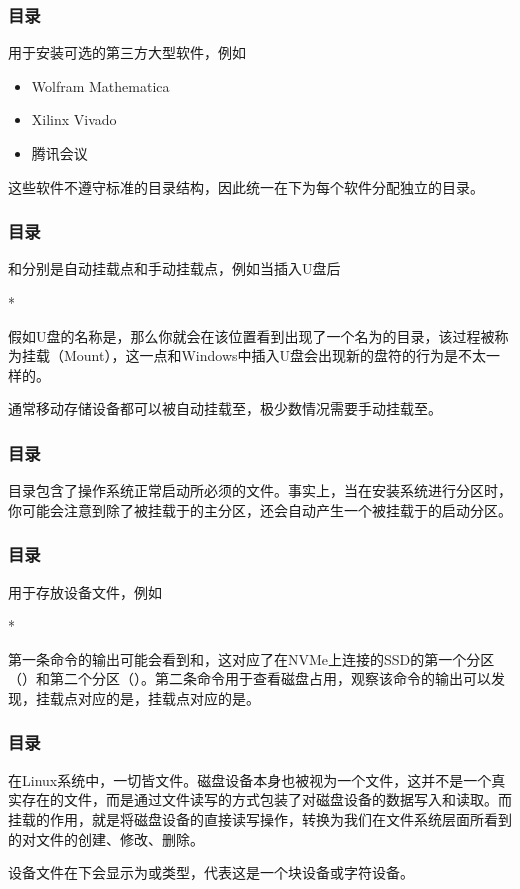 \begin{frame}
    \frametitle{目录}
    用于安装可选的第三方大型软件，例如
    \begin{itemize}
        \item Wolfram Mathematica
        \item Xilinx Vivado
        \item 腾讯会议
    \end{itemize}
    这些软件不遵守标准的目录结构，因此统一在下为每个软件分配独立的目录。
\end{frame}

\begin{frame}
    \frametitle{目录}
    和分别是自动挂载点和手动挂载点，例如当插入U盘后
    \begin{Code}*
        
    \end{Code}
    假如U盘的名称是，那么你就会在该位置看到出现了一个名为的目录，该过程被称为挂载（Mount），这一点和Windows中插入U盘会出现新的盘符的行为是不太一样的。
    
    通常移动存储设备都可以被自动挂载至，极少数情况需要手动挂载至。
\end{frame}

\begin{frame}
    \frametitle{目录}
    目录包含了操作系统正常启动所必须的文件。事实上，当在安装系统进行分区时，你可能会注意到除了被挂载于\code{/}的主分区，还会自动产生一个被挂载于的启动分区。
\end{frame}

\begin{frame}
    \frametitle{目录}
    用于存放设备文件，例如
    \begin{Code}*
        
    \end{Code}
    第一条命令的输出可能会看到和，这对应了在NVMe上连接的SSD的第一个分区（）和第二个分区（）。第二条命令用于查看磁盘占用，观察该命令的输出可以发现，挂载点\code{/}对应的是，挂载点对应的是。
\end{frame}

\begin{frame}
    \frametitle{目录}
    在Linux系统中，\alert{一切皆文件}。磁盘设备本身也被视为一个文件，这并不是一个真实存在的文件，而是通过文件读写的方式包装了对磁盘设备的数据写入和读取。而挂载的作用，就是将磁盘设备的直接读写操作，转换为我们在文件系统层面所看到的对文件的创建、修改、删除。

    设备文件在下会显示为或类型，代表这是一个块设备或字符设备。
\end{frame}

